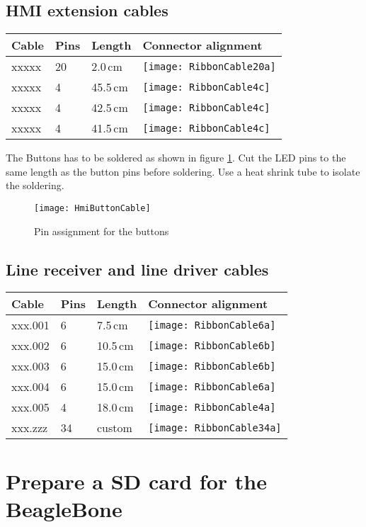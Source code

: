 \subsection{HMI extension cables}
\label{sec:hmiExtensionCables}

\begin{tabular}{m{2cm} m{2cm} m{2cm} m{5cm}}
Cable & Pins & Length & Connector alignment\\
\hline
xxxxx & 20 & 2.0\,cm          & \texttt{[image: RibbonCable20a]} \\
\hline
xxxxx & 4  & 45.5\,cm         & \texttt{[image: RibbonCable4c]} \\
\hline
xxxxx & 4  & 42.5\,cm         & \texttt{[image: RibbonCable4c]} \\
\hline
xxxxx & 4  & 41.5\,cm         & \texttt{[image: RibbonCable4c]} \\
\hline
\end{tabular}

The Buttons has to be soldered as shown in figure \ref{fig:HmiButtonCable}. Cut the LED pins to the same length as the button pins before soldering. Use a heat shrink tube to isolate the soldering.

\begin{figure}[htbp]
	\centering
	\texttt{[image: HmiButtonCable]}
	\caption{Pin assignment for the buttons}
	\label{fig:HmiButtonCable}
\end{figure}

\subsection{Line receiver and line driver cables}

\begin{tabular}{m{2cm} m{2cm} m{2cm} m{5cm}}
Cable & Pins & Length & Connector alignment\\
\hline
xxx.001 & 6 & 7.5\,cm & \texttt{[image: RibbonCable6a]} \\
\hline
xxx.002 & 6 & 10.5\,cm & \texttt{[image: RibbonCable6b]} \\
\hline
xxx.003 & 6 & 15.0\,cm & \texttt{[image: RibbonCable6b]} \\
\hline
xxx.004 & 6 & 15.0\,cm & \texttt{[image: RibbonCable6a]} \\
\hline
xxx.005 & 4 & 18.0\,cm & \texttt{[image: RibbonCable4a]} \\
\hline
xxx.zzz & 34 & custom & \texttt{[image: RibbonCable34a]} \\
\hline
\end{tabular}

\section{Prepare a SD card for the BeagleBone}


